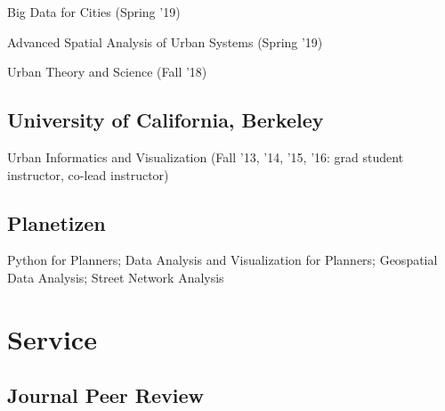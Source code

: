\documentclass[12pt,letterpaper]{report}
\newcommand{\listitemspace}{0.15em}
\renewenvironment{itemize}
{\begin{list}{}{\setlength{\leftmargin}{0em}
			\setlength{\parskip}{0em}
			\setlength{\itemsep}{\listitemspace}
			\setlength{\parsep}{\listitemspace}}}
	{\end{list}}
\begin{document}
	\begin{itemize}

		\item Big Data for Cities (Spring '19)

		\item Advanced Spatial Analysis of Urban Systems (Spring '19)

		\item Urban Theory and Science (Fall '18)

	\end{itemize}

	\subsection*{University of California, Berkeley}

	\begin{itemize}

		\item Urban Informatics and Visualization (Fall '13, '14, '15, '16: grad student instructor, co-lead instructor)

	\end{itemize}

	\subsection*{Planetizen}

	\begin{itemize}

		\item Python for Planners; Data Analysis and Visualization for Planners; Geospatial Data Analysis; Street Network Analysis

	\end{itemize}


	\section*{Service}

	\subsection*{Journal Peer Review}
\end{document}
